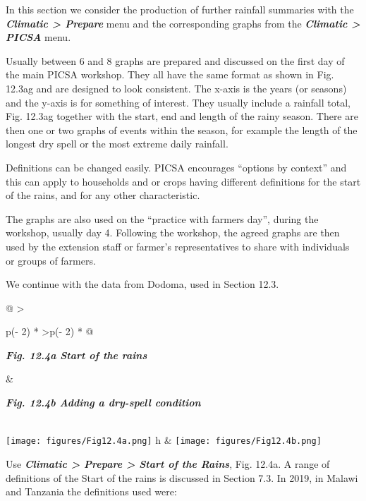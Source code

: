\documentclass[
  letterpaper,
  DIV=11,
  numbers=noendperiod]{scrreprt}
\begin{document}
In this section we consider the production of further rainfall summaries
with the \textbf{\emph{Climatic \textgreater{} Prepare}} menu and the
corresponding graphs from the \textbf{\emph{Climatic \textgreater{}
PICSA}} menu.

Usually between 6 and 8 graphs are prepared and discussed on the first
day of the main PICSA workshop. They all have the same format as shown
in Fig. 12.3ag and are designed to look consistent. The x-axis is the
years (or seasons) and the y-axis is for something of interest. They
usually include a rainfall total, Fig. 12.3ag together with the start,
end and length of the rainy season. There are then one or two graphs of
events within the season, for example the length of the longest dry
spell or the most extreme daily rainfall.

Definitions can be changed easily. PICSA encourages ``options by
context'' and this can apply to households and or crops having different
definitions for the start of the rains, and for any other
characteristic.

The graphs are also used on the ``practice with farmers day'', during
the workshop, usually day 4. Following the workshop, the agreed graphs
are then used by the extension staff or farmer's representatives to
share with individuals or groups of farmers.

We continue with the data from Dodoma, used in Section 12.3.

\begin{longtable}[]{@{}
  >{\raggedright\arraybackslash}p{(\columnwidth - 2\tabcolsep) * }
  >{\centering\arraybackslash}p{(\columnwidth - 2\tabcolsep) * }@{}}
\toprule\noalign{}
\begin{minipage}[b]{\linewidth}\raggedright
\textbf{\emph{Fig. 12.4a Start of the rains}}
\end{minipage} & \begin{minipage}[b]{\linewidth}\centering
\textbf{\emph{Fig. 12.4b Adding a dry-spell condition}}
\end{minipage} \\
\midrule\noalign{}
\endhead
\bottomrule\noalign{}
\endlastfoot
\texttt{[image: figures/Fig12.4a.png]}
h &
\texttt{[image: figures/Fig12.4b.png]} \\
\end{longtable}

Use \textbf{\emph{Climatic \textgreater{} Prepare \textgreater{} Start
of the Rains}}, Fig. 12.4a. A range of definitions of the Start of the
rains is discussed in Section 7.3. In 2019, in Malawi and Tanzania the
definitions used were:
\end{document}

